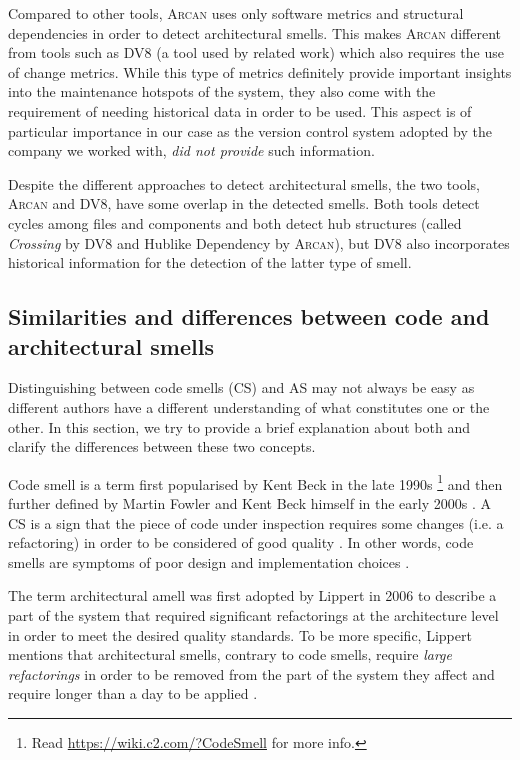 Compared to other tools, \textsc{Arcan} uses only software metrics and structural dependencies in order to detect architectural smells. 
This makes \textsc{Arcan} different from tools such as DV8 \cite{Mo2015} (a tool used by related work) which also requires the use of change metrics.
While this type of metrics definitely provide important insights into the maintenance hotspots of the system, they also come with the requirement of needing historical data in order to be used.
This aspect is of particular importance in our case as the version control system adopted by the company we worked with, \emph{did not provide} such information.

Despite the different approaches to detect architectural smells, the two tools,  \textsc{Arcan} and DV8, have some overlap in the detected smells. 
Both tools detect cycles among files and components and both detect hub structures (called \emph{Crossing} by DV8 and Hublike Dependency by \textsc{Arcan}), but DV8 also incorporates historical information for the detection of the latter type of smell.


\subsection{Similarities and differences between code and architectural smells}
Distinguishing between code smells (CS) and AS may not always be easy as different authors have a different understanding of what constitutes one or the other.
In this section, we try to provide a brief explanation about both and clarify the differences between these two concepts.

Code smell is a term first popularised by Kent Beck in the late 1990s \footnote{Read \url{https://wiki.c2.com/?CodeSmell} for more info.} and then further defined by Martin Fowler and Kent Beck himself in the early 2000s \cite{Fowler2002}.
A CS is a sign that the piece of code under inspection requires some changes (i.e. a refactoring) in order to be considered of good quality \cite{Fowler2002}. 
In other words, code smells are symptoms of poor design and implementation choices \cite{Tufano2015}.

The term architectural amell was first adopted by Lippert \cite{Lippert2006} in 2006 to describe a part of the system that required significant refactorings at the architecture level in order to meet the desired quality standards.
To be more specific, Lippert mentions that architectural smells, contrary to code smells, require \emph{large refactorings} in order to be removed from the part of the system they affect and require longer than a day to be applied \cite{Lippert2006}.

